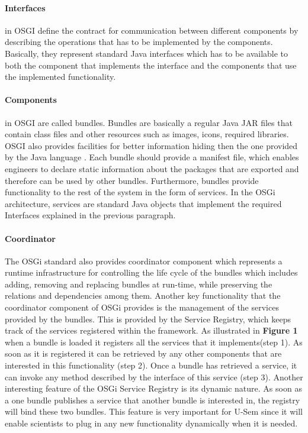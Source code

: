 \paragraph{Interfaces}
 in OSGI define the contract for communication between different components by describing the operations that has to be implemented by the components. Basically, they represent standard Java interfaces which has to be available to both the component that implements the interface and the components that use the implemented functionality.


\paragraph{Components}
  in OSGI are called bundles. Bundles are basically a regular Java JAR files that contain class files and other resources such as images, icons, required libraries. OSGI also provides facilities for better information hiding then the one provided by the Java language \cite{Andre}. Each bundle should provide a manifest file, which enables engineers to declare static information about the packages that are exported and therefore can be used by other bundles. Furthermore, bundles provide functionality to the rest of the system in the form of services. In the OSGi architecture, services are standard Java objects that implement the required  Interfaces explained in the previous paragraph.

\paragraph{Coordinator}
The OSGi standard also provides coordinator component which represents a runtime infrastructure for controlling the life cycle of the bundles which includes adding, removing and replacing bundles at run-time, while preserving the relations and dependencies among them. Another key functionality that the coordinator component of OSGi provides is the management of the services provided by the bundles. This is provided by the Service Registry, which keeps track of the services registered within the framework. As illustrated in \textbf{Figure 1} when a bundle is loaded it registers all the services that it implements(step 1). As soon as it is registered it can be retrieved by any other components that are interested in this functionality (step 2). Once a bundle has retrieved a service, it can invoke any method described by the interface of this service (step 3). Another interesting feature of the OSGi Service Registry is its dynamic nature. As soon as a one bundle publishes a service that another bundle is interested in, the registry will bind these two bundles. This feature is very important for U-Sem since it will enable scientists to plug in any new functionality dynamically when it is needed.


